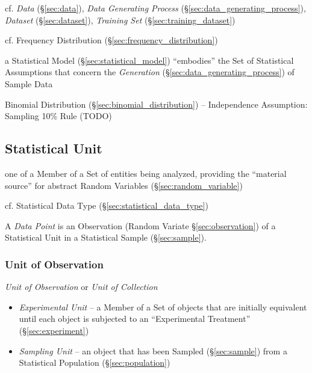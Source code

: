\fist cf. \emph{Data} (\S\ref{sec:data}), \emph{Data Generating Process}
(\S\ref{sec:data_generating_process}), \emph{Dataset} (\S\ref{sec:dataset}),
\emph{Training Set} (\S\ref{sec:training_dataset})

\fist cf. Frequency Distribution (\S\ref{sec:frequency_distribution})

\fist a Statistical Model (\S\ref{sec:statistical_model}) ``embodies'' the Set
of Statistical Assumptions that concern the \emph{Generation}
(\S\ref{sec:data_generating_process}) of Sample Data

Binomial Distribution (\S\ref{sec:binomial_distribution}) -- Independence
Assumption: Sampling 10\% Rule (TODO)



\subsection{Statistical Unit}\label{sec:statistical_unit}

one of a Member of a Set of entities being analyzed, providing the ``material
source'' for abstract Random Variables (\S\ref{sec:random_variable})

cf. Statistical Data Type (\S\ref{sec:statistical_data_type})

\fist A \emph{Data Point} is an Observation (Random Variate
\S\ref{sec:observation}) of a Statistical Unit in a Statistical Sample
(\S\ref{sec:sample}).



\subsubsection{Unit of Observation}\label{sec:observational_unit}

\emph{Unit of Observation} or \emph{Unit of Collection}

\begin{itemize}
  \item \emph{Experimental Unit} -- a Member of a Set of objects that are
    initially equivalent until each object is subjected to an ``Experimental
    Treatment'' (\S\ref{sec:experiment})
  \item \emph{Sampling Unit} -- an object that has been Sampled
    (\S\ref{sec:sample}) from a Statistical Population (\S\ref{sec:population})
\end{itemize}

